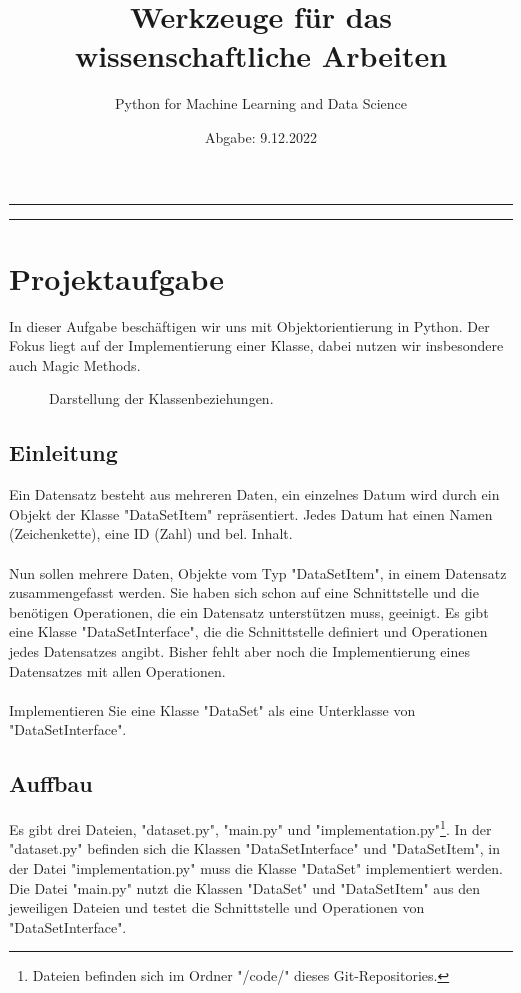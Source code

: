 \documentclass[]{scrartcl}
\title{Werkzeuge für das wissenschaftliche Arbeiten}
\subtitle{Python for Machine Learning and Data Science}
\date{Abgabe: 9.12.2022}
\begin{document}
    \maketitle
    \hrule
    \tableofcontents
    \hfill\hrule
    \section{Projektaufgabe}
    In dieser Aufgabe beschäftigen wir uns mit Objektorientierung in Python. Der Fokus liegt auf der Implementierung einer Klasse, dabei nutzen wir insbesondere auch Magic Methods.\\
    \begin{figure}[h]
        \centering
        \scalebox{0.85}{
            
        }
  		\caption{Darstellung der Klassenbeziehungen.}
	\end{figure}
    \pagebreak
    \subsection{Einleitung}
        Ein Datensatz besteht aus mehreren Daten, ein einzelnes Datum wird durch ein Objekt der Klasse "{}DataSetItem"{} repräsentiert. Jedes Datum hat einen Namen (Zeichenkette), eine ID (Zahl) und bel. Inhalt.\\
        \\
        Nun sollen mehrere Daten, Objekte vom Typ "{}DataSetItem"{}, in einem Datensatz zusammengefasst werden.
        Sie haben sich schon auf eine Schnittstelle und die benötigen Operationen, die ein Datensatz unterstützen muss, geeinigt.
        Es gibt eine Klasse "{}DataSetInterface"{}, die die Schnittstelle definiert und Operationen jedes Datensatzes angibt.
        Bisher fehlt aber noch die Implementierung eines Datensatzes mit allen Operationen.\\
        \\
        Implementieren Sie eine Klasse "{}DataSet"{} als eine Unterklasse von "{}DataSetInterface"{}.
    \subsection{Auffbau}
        Es gibt drei Dateien, "{}dataset.py"{}, "{}main.py"{} und "{}implementation.py"{}\footnote{Dateien befinden sich im Ordner "{}/code/"{} dieses Git-Repositories.}. In der "{}dataset.py"{} befinden sich die Klassen "{}DataSetInterface"{} und "{}DataSetItem"{}, in der Datei "{}implementation.py"{} muss die Klasse "{}DataSet"{} implementiert werden. Die Datei "{}main.py"{} nutzt die Klassen "{}DataSet"{} und "{}DataSetItem"{} aus den jeweiligen Dateien und testet die Schnittstelle und Operationen von "{}DataSetInterface"{}.
\end{document}
